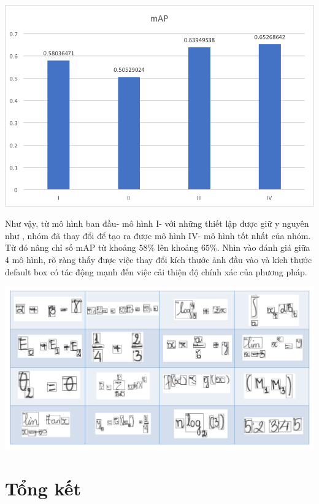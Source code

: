 \documentclass[a4paper]{article}
\theoremstyle{definition}
\begin{document}
	\vspace{1.5cm}
	\begin{center}
		\centering
		\includegraphics[width=0.775\linewidth]{mAP.png}
		\vspace{0.5cm}
	\end{center}
	Như vậy, từ mô hình ban đầu- mô hình I- với những thiết lập được giữ y nguyên như \cite{liu2016ssd}, nhóm đã thay đổi để tạo ra được mô hình IV- mô hình tốt nhất của nhóm. Từ đó nâng chỉ số mAP từ khoảng $58\%$ lên khoảng $65\%$. Nhìn vào đánh giá giữa 4 mô hình, rõ ràng thấy được việc thay đổi kích thước ảnh đầu vào và kích thước default box có tác động mạnh đến việc cải thiện độ chính xác của phương pháp. 
	\vspace{1cm}
	\begin{center}
		\centering
		\includegraphics[width=0.99\linewidth]{result}
		\vspace{0.5cm}
	\end{center}
	\newpage	
	\section{Tổng kết}
	
\end{document}
